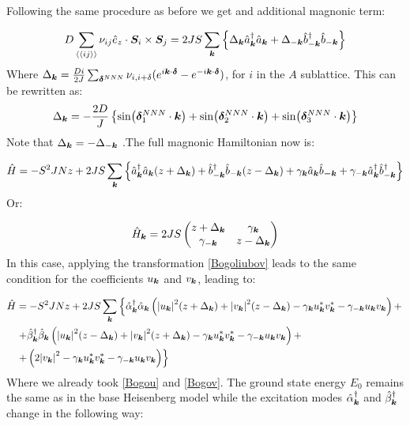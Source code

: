  Following the same procedure as before we get and additional magnonic term:

\begin{equation}
D \sum_{\langle \langle i j \rangle \rangle} \nu_{ij}\hat{e}_z \cdot\boldsymbol{S}_i \times \boldsymbol{S}_j = 2JS\sum_{\boldsymbol{k}} \left\{ \Delta_{\boldsymbol{k}}\hat{a}^\dagger_{\boldsymbol{k}}\hat{a}_{\boldsymbol{k}} + \Delta_{-\boldsymbol{k}}\hat{b}^\dagger_{-\boldsymbol{k}}\hat{b}_{-\boldsymbol{k}} \right\}
\end{equation}
Where $\Delta_{\boldsymbol{k}} = \frac{Di}{2J}\sum_{\boldsymbol{\delta}^{NNN}} \nu_{i,i+\delta} (e^{i\boldsymbol{k}\cdot\boldsymbol{\delta}} -e^{-i\boldsymbol{k}\cdot\boldsymbol{\delta}})$, for $i$ in the $A$ sublattice. This can be rewritten as:
\begin{equation}
\Delta_{\boldsymbol{k}} = -\frac{2D}{J}\left\{ \sin(\boldsymbol{\delta}^{NNN}_1 \cdot \boldsymbol{k}) + \sin(\boldsymbol{\delta}^{NNN}_2 \cdot \boldsymbol{k}) + \sin(\boldsymbol{\delta}^{NNN}_3 \cdot \boldsymbol{k})\right\}
\end{equation}
Note that $\Delta_{\boldsymbol{k}}=-\Delta_{-\boldsymbol{k}}$ .The full magnonic Hamiltonian now is:

\begin{equation}
\label{MagnonicH2}
\hat{H} = -S^2JNz + 2JS \sum_{\boldsymbol{k}} \left\{ \hat{a}^\dagger_{\boldsymbol{k}}\hat{a}_{\boldsymbol{k}}(z+\Delta_{\boldsymbol{k}}) + \hat{b}^\dagger_{-\boldsymbol{k}}\hat{b}_{-\boldsymbol{k}}(z-\Delta_{\boldsymbol{k}}) + \gamma_{\boldsymbol{k}}\hat{a}_{\boldsymbol{k}}\hat{b}_{\boldsymbol{-k}} + \gamma_{-\boldsymbol{k}}\hat{a}^\dagger_{\boldsymbol{k}}\hat{b}^\dagger_{-\boldsymbol{k}} \right\}
\end{equation}
Or:

\begin{equation}
\hat{H}_{\boldsymbol{k}} = 2JS\begin{pmatrix} 
z + \Delta_{\boldsymbol{k}}& \gamma_{\boldsymbol{k}} \\
\gamma_{-\boldsymbol{k}} & z - \Delta_{\boldsymbol{k}}
\end{pmatrix} \label{MatrixMagnonDMI}
\end{equation}
In this case, applying the transformation \ref{Bogoliubov} leads to the same condition for the coefficients  $u_{\boldsymbol{k}}$ and $v_{\boldsymbol{k}}$, leading to:

\begin{align*}
\hat{H} &= -S^2JNz  + 2JS\sum_{\boldsymbol{k}} \left\{ \hat{\alpha}_{\boldsymbol{k}}^\dagger \hat{\alpha}_{\boldsymbol{k}} \left( \abs{u_{\boldsymbol{k}}}^2(z+\Delta_{\boldsymbol{k}}) + \abs{v_{\boldsymbol{k}}}^2(z-\Delta_{\boldsymbol{k}}) -\gamma_{\boldsymbol{k}}u_{\boldsymbol{k}}^*v_{\boldsymbol{k}}^*-\gamma_{-\boldsymbol{k}}u_{\boldsymbol{k}}v_{\boldsymbol{k}} \right) + \right. \\
&\left. + \hat{\beta}_{\boldsymbol{k}}^\dagger \hat{\beta}_{\boldsymbol{k}} \left( \abs{u_{\boldsymbol{k}}}^2(z-\Delta_{\boldsymbol{k}}) + \abs{v_{\boldsymbol{k}}}^2(z+\Delta_{\boldsymbol{k}}) -\gamma_{\boldsymbol{k}}u_{\boldsymbol{k}}^*v_{\boldsymbol{k}}^*-\gamma_{-\boldsymbol{k}}u_{\boldsymbol{k}}v_{\boldsymbol{k}} \right) + \right. \\
&\left. + \left( 2\abs{v_{\boldsymbol{k}}}^2 - \gamma_{\boldsymbol{k}}u_{\boldsymbol{k}}^*v_{\boldsymbol{k}}^*-\gamma_{-\boldsymbol{k}}u_{\boldsymbol{k}}v_{\boldsymbol{k}}\right) \right\}
\end{align*}
Where we already took \ref{Bogou} and \ref{Bogov}. The ground state energy $E_0$ remains the same as in the base Heisenberg model while the excitation modes $\hat{\alpha}_{\boldsymbol{k}}^\dagger$ and $\hat{\beta}_{\boldsymbol{k}}^\dagger$ change in the following way:

